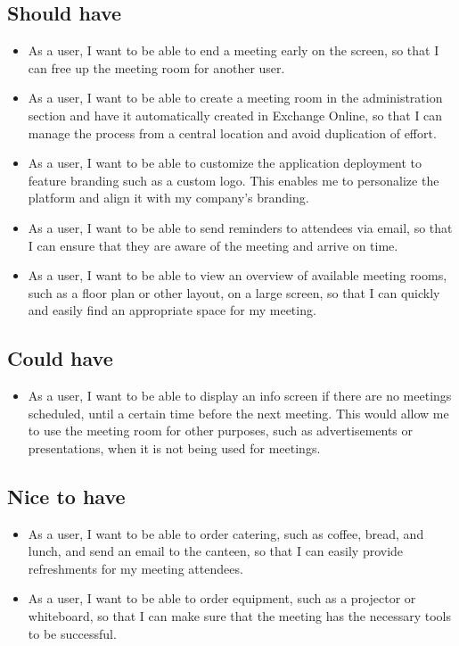 \subsection{Should have}
\begin{itemize}
\item As a user, I want to be able to end a meeting early on the screen, so that I can free up the meeting room for another user.
\item As a user, I want to be able to create a meeting room in the administration section and have it automatically created in Exchange Online, so that I can manage the process from a central location and avoid duplication of effort.
\item As a user, I want to be able to customize the application deployment to feature branding such as a custom logo. This enables me to personalize the platform and align it with my company's branding.
\item As a user, I want to be able to send reminders to attendees via email, so that I can ensure that they are aware of the meeting and arrive on time.
\item As a user, I want to be able to view an overview of available meeting rooms, such as a floor plan or other layout, on a large screen, so that I can quickly and easily find an appropriate space for my meeting.
\end{itemize}

\subsection{Could have}
\begin{itemize}
\item As a user, I want to be able to display an info screen if there are no meetings scheduled, until a certain time before the next meeting. This would allow me to use the meeting room for other purposes, such as advertisements or presentations, when it is not being used for meetings.
\end{itemize}

\subsection{Nice to have}
\begin{itemize}
\item As a user, I want to be able to order catering, such as coffee, bread, and lunch, and send an email to the canteen, so that I can easily provide refreshments for my meeting attendees.
\item As a user, I want to be able to order equipment, such as a projector or whiteboard, so that I can make sure that the meeting has the necessary tools to be successful.
\end{itemize}